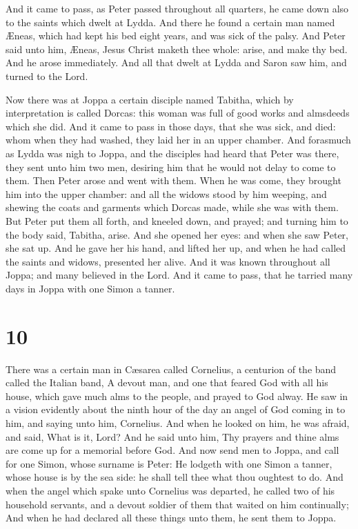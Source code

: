  And it came to pass, as Peter passed throughout all
quarters, he came down also to the saints which dwelt at Lydda.
 And there he found a certain man named Æneas, which had
kept his bed eight years, and was sick of the palsy.  And
Peter said unto him, Æneas, Jesus Christ maketh thee whole: arise, and
make thy bed. And he arose immediately.  And all that
dwelt at Lydda and Saron saw him, and turned to the Lord.

 Now there was at Joppa a certain disciple named Tabitha,
which by interpretation is called Dorcas: this woman was full of good
works and almsdeeds which she did.  And it came to pass
in those days, that she was sick, and died: whom when they had washed,
they laid her in an upper chamber.  And forasmuch as
Lydda was nigh to Joppa, and the disciples had heard that Peter was
there, they sent unto him two men, desiring him that he would not delay
to come to them.  Then Peter arose and went with them.
When he was come, they brought him into the upper chamber: and all the
widows stood by him weeping, and shewing the coats and garments which
Dorcas made, while she was with them.  But Peter put them
all forth, and kneeled down, and prayed; and turning him to the body
said, Tabitha, arise. And she opened her eyes: and when she saw Peter,
she sat up.  And he gave her his hand, and lifted her up,
and when he had called the saints and widows, presented her alive.
 And it was known throughout all Joppa; and many believed
in the Lord.  And it came to pass, that he tarried many
days in Joppa with one Simon a tanner.

\hypertarget{section-9}{%
\section{10}\label{section-9}}

 There was a certain man in Cæsarea called Cornelius, a
centurion of the band called the Italian band,  A devout
man, and one that feared God with all his house, which gave much alms to
the people, and prayed to God alway.  He saw in a vision
evidently about the ninth hour of the day an angel of God coming in to
him, and saying unto him, Cornelius.  And when he looked
on him, he was afraid, and said, What is it, Lord? And he said unto him,
Thy prayers and thine alms are come up for a memorial before God.
 And now send men to Joppa, and call for one Simon, whose
surname is Peter:  He lodgeth with one Simon a tanner,
whose house is by the sea side: he shall tell thee what thou oughtest to
do.  And when the angel which spake unto Cornelius was
departed, he called two of his household servants, and a devout soldier
of them that waited on him continually;  And when he had
declared all these things unto them, he sent them to Joppa.

